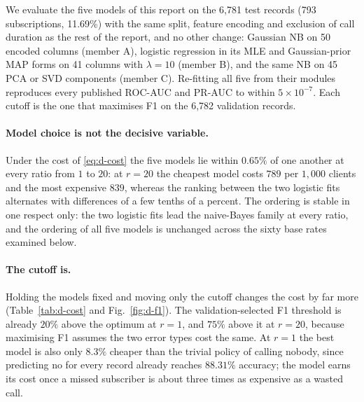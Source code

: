 We evaluate the five models of this report on the 6,781 test records
(793 subscriptions, 11.69\%) with the same split, feature encoding and
exclusion of call duration as the rest of the report, and no other change:
Gaussian NB on 50 encoded columns (member A), logistic regression in its
MLE and Gaussian-prior MAP forms on 41 columns with $\lambda=10$ (member B),
and the same NB on 45 PCA or SVD components (member C). Re-fitting all five
from their modules reproduces every published ROC-AUC and PR-AUC to within
$5\times10^{-7}$. Each cutoff is the one that maximises F1 on the 6,782
validation records.

\paragraph{Model choice is not the decisive variable.}
Under the cost of \eqref{eq:d-cost} the five models lie within
$0.65\%$ of one another at every ratio from $1$ to $20$: at $r=20$ the
cheapest model costs $789$ per $1{,}000$ clients and the most expensive
$839$, whereas the ranking between the two logistic fits alternates with
differences of a few tenths of a percent. The ordering is stable in one
respect only: the two logistic fits lead the naive-Bayes family at every
ratio, and the ordering of all five models is unchanged across the sixty
base rates examined below.

\paragraph{The cutoff is.}
Holding the models fixed and moving only the cutoff changes the cost by far
more (Table~\ref{tab:d-cost} and Fig.~\ref{fig:d-f1}). The validation-selected
F1 threshold is already $20\%$ above the optimum at $r=1$, and $75\%$ above
it at $r=20$, because maximising F1 assumes the two error types cost the
same. At $r=1$ the best model is also only $8.3\%$ cheaper than the trivial
policy of calling nobody, since predicting no for every record already
reaches $88.31\%$ accuracy; the model earns its cost once a missed
subscriber is about three times as expensive as a wasted call.

